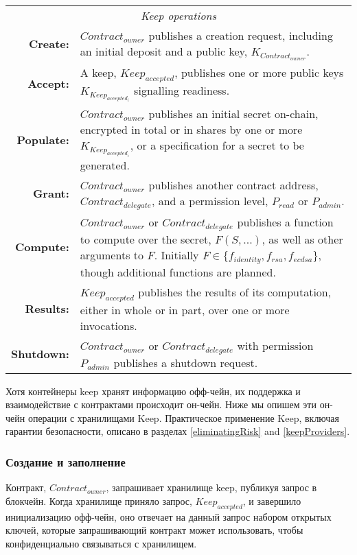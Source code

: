 \documentclass[russian,english,11pt]{article}
\begin{document}
\begin{table*}[t]
  \centering
  \begin{tabular}{|rp{10cm}|}
  \hline
  \multicolumn{2}{|c|}{\textit{Keep operations}} \\
  \textbf{Create:} & $Contract_{owner}$ publishes a creation request,
  including an initial deposit and a public key,
  $K_{Contract_{owner}}$.\\
  \textbf{Accept:} & A keep, $Keep_{accepted}$, publishes one or more
  public keys $K_{Keep_{accepted_i}}$ signalling readiness.\\
  \textbf{Populate:} & $Contract_{owner}$ publishes an initial
  secret on-chain, encrypted in total or in shares by one or more
  $K_{Keep_{accepted_i}}$, or a specification for a secret to be
  generated.\\
  \textbf{Grant:} & $Contract_{owner}$ publishes another contract
  address, $Contract_{delegate}$, and a permission level, $P_{read}$
  or $P_{admin}$.\\
  \textbf{Compute:} & $Contract_{owner}$ or $Contract_{delegate}$
  publishes a function to compute over the secret, $F(S,...)$, as well
  as other arguments to $F$. Initially $F {\in}
  \{f_{identity},f_{rsa},f_{ecdsa}\}$, though additional functions are
  planned.\\
  \textbf{Results:} & $Keep_{accepted}$ publishes the results
  of its computation, either in whole or in part, over one or more
  invocations.\\
  \textbf{Shutdown:} & $Contract_{owner}$ or $Contract_{delegate}$
  with permission $P_{admin}$ publishes a shutdown request.\\
  \hline
\end{tabular}
\end{table*}

Хотя контейнеры keep хранят информацию офф-чейн, их поддержка и 
взаимодействие с контрактами происходит он-чейн. Ниже мы опишем 
эти он-чейн операции с хранилищами Keep. Практическое применение 
Keep, включая гарантии безопасности, описано в разделах \ref{eliminatingRisk} 
and \ref{keepProviders}.

\subsubsection{Создание и заполнение}

Контракт, $Contract_{owner}$, запрашивает хранилище keep, публикуя запрос 
в блокчейн. Когда хранилище приняло запрос, $Keep_{accepted}$, и завершило 
инициализацию офф-чейн, оно отвечает на данный запрос набором открытых 
ключей, которые запрашивающий контракт может использовать, чтобы 
конфиденциально связываться с хранилищем. 
\end{document}
